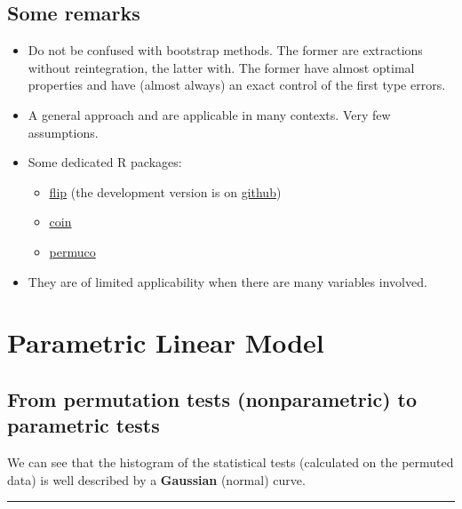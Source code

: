 \documentclass[]{article}
\providecommand{\tightlist}{%
  \setlength{\itemsep}{0pt}\setlength{\parskip}{0pt}}
\begin{document}
\subsection{Some remarks}\label{some-remarks-1}

\begin{itemize}
\tightlist
\item
  Do not be confused with bootstrap methods. The former are extractions
  without reintegration, the latter with. The former have almost optimal
  properties and have (almost always) an exact control of the first type
  errors.
\item
  A general approach and are applicable in many contexts. Very few
  assumptions.
\item
  Some dedicated R packages:

  \begin{itemize}
  \tightlist
  \item
    \href{http://cran.r-project.org/web/packages/flip/index.html}{flip}
    (the development version is on
    \href{https://github.com/livioivil/flip}{github})
  \item
    \href{http://cran.r-project.org/web/packages/coin/index.html}{coin}
  \item
    \href{https://cran.r-project.org/web/packages/permuco/index.html}{permuco}
  \end{itemize}
\item
  They are of limited applicability when there are many variables
  involved.
\end{itemize}

\section{Parametric Linear Model}\label{parametric-linear-model}

\subsection{From permutation tests (nonparametric) to parametric
tests}\label{from-permutation-tests-nonparametric-to-parametric-tests}

We can see that the histogram of the statistical tests (calculated on
the permuted data) is well described by a \textbf{Gaussian }(normal)
curve.

\begin{center}\rule{0.5\linewidth}{\linethickness}\end{center}
\end{document}
